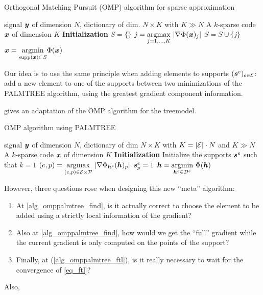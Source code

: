\begin{algorithm}[!ht]
    \caption{Orthogonal Matching Pursuit (OMP) algorithm for sparse approximation}\label{alg_omp}
  \begin{algorithmic}[1]
    \Input signal $\bm{y}$ of dimension $N$, dictionary of dim. $N \times K$ with $K \gg N$
    \Output A $k$-sparse code $\bm{x}$ of dimension $K$
    \State \textbf{Initialization} $S=\{\}$
      \State $j =  \underset{j = 1,\dots,K}{\operatorname*{\arg\!\max}}~| \nabla \Phi(\bm{x})_j |$ \label{alg_omp_pick_correlation}
      \State $S = S \cup \{j\}$
      \State $\bm{x} = \underset{\text{supp}(\bm{x}) \subset S}{\operatorname{argmin}} \Phi(\bm{x})$
    \EndFor
  \end{algorithmic}
\end{algorithm}

Our idea is to use the same principle when adding elements to supports $(\bm{s}^e)_{e \in \mathcal E}$: add a new element to one of the supports between two minimizations of the \ac{PALMTREE} algorithm, using the greatest gradient component information.

 gives an adaptation of the \ac{OMP} algorithm for the \gls{treemodel}.

\begin{algorithm}[!ht]
    \caption{\ac{OMP} algorithm using \ac{PALMTREE}}\label{alg_omppalmtree}
  \begin{algorithmic}[1]
    \Input signal $\bm{y}$ of dimension $N$, dictionary of dim $N \times K$ with $K = |\mathcal E| \cdot N$ and $K \gg N$
    \Output A $k$-sparse code $\bm{x}$ of dimension $K$
    \State \textbf{Initialization} Initialize the supports $\bm{s}^e$ such that $k=1$
      \State $(e,p) = \underset{(e,p) \in \mathcal E \times \mathcal P}{\operatorname*{\arg\!\max}}~ |\nabla \Phi_{\bm{h}^e}(\bm{h})_p|$ \label{alg_omppalmtree_find}
      \State $\bm{s}^e_p = 1$
      \State $\bm{h} = \underset{\bm{h}^e \in {\mathcal D}^e}{\operatorname{argmin}}~ \Phi(\bm{h})$  \label{alg_omppalmtree_ftl}
    \EndFor
  \end{algorithmic}
\end{algorithm}


However, three questions rose when designing this new “meta” algorithm:
\begin{enumerate}[label={\alph*)},noitemsep]
	\item At \cref{alg_omppalmtree_find}, is it actually correct to choose the element to be added using a strictly local information of the gradient?
	\item Also at \cref{alg_omppalmtree_find}, how would we get the “full” gradient while the current gradient is only computed on the points of the support?
	\item Finally, at (\cref{alg_omppalmtree_ftl}), is it really necessary to wait for the convergence of \eqref{eq_ftl}?
\end{enumerate}
  Also, 

